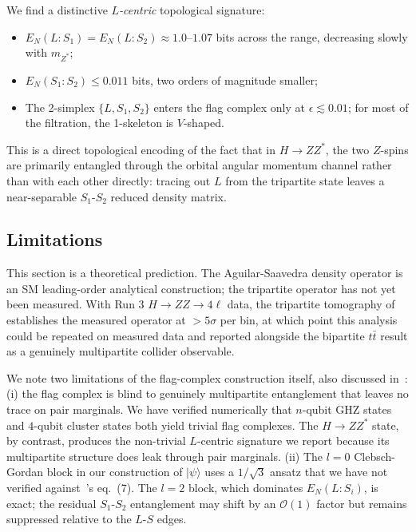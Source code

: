 \documentclass[11pt,a4paper]{article}
\theoremstyle{definition}
\begin{document}
We find a distinctive \emph{$L$-centric} topological signature:
\begin{itemize}
\item $E_N(L{:}S_1) = E_N(L{:}S_2) \approx 1.0$--$1.07$ bits across the range, decreasing slowly with $m_{Z^*}$;
\item $E_N(S_1{:}S_2) \leq 0.011$ bits, two orders of magnitude smaller;
\item The 2-simplex $\{L, S_1, S_2\}$ enters the flag complex only at $\epsilon \lesssim 0.01$; for most of the filtration, the 1-skeleton is $V$-shaped.
\end{itemize}
This is a direct topological encoding of the fact that in $H \to ZZ^*$, the two $Z$-spins are primarily entangled through the orbital angular momentum channel rather than with each other directly: tracing out $L$ from the tripartite state leaves a near-separable $S_1$-$S_2$ reduced density matrix.

\subsection{Limitations}

This section is a theoretical prediction. The Aguilar-Saavedra density operator is an SM leading-order analytical construction; the tripartite operator has not yet been measured. With Run 3 $H \to ZZ \to 4\ell$ data, the tripartite tomography of~\cite{AS2024} establishes the measured operator at $>5\sigma$ per bin, at which point this analysis could be repeated on measured data and reported alongside the bipartite $t\bar{t}$ result as a genuinely multipartite collider observable.

We note two limitations of the flag-complex construction itself, also discussed in~\cite{Scott2026RWF}: (i) the flag complex is blind to genuinely multipartite entanglement that leaves no trace on pair marginals. We have verified numerically that $n$-qubit GHZ states and $4$-qubit cluster states both yield trivial flag complexes. The $H \to ZZ^*$ state, by contrast, produces the non-trivial $L$-centric signature we report because its multipartite structure does leak through pair marginals. (ii) The $l=0$ Clebsch-Gordan block in our construction of $|\psi\rangle$ uses a $1/\sqrt{3}$ ansatz that we have not verified against~\cite{AS2024}'s eq.~(7). The $l=2$ block, which dominates $E_N(L{:}S_i)$, is exact; the residual $S_1$-$S_2$ entanglement may shift by an $\mathcal{O}(1)$ factor but remains suppressed relative to the $L$-$S$ edges.
\end{document}
